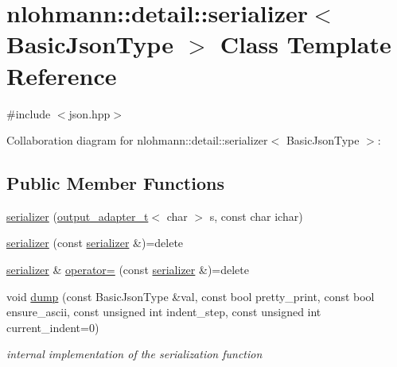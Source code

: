 \hypertarget{classnlohmann_1_1detail_1_1serializer}{}\section{nlohmann\+:\+:detail\+:\+:serializer$<$ Basic\+Json\+Type $>$ Class Template Reference}
\label{classnlohmann_1_1detail_1_1serializer}


{\ttfamily \#include $<$json.\+hpp$>$}



Collaboration diagram for nlohmann\+:\+:detail\+:\+:serializer$<$ Basic\+Json\+Type $>$\+:
\subsection*{Public Member Functions}
\begin{DoxyCompactItemize}
\item 
\hyperlink{classnlohmann_1_1detail_1_1serializer_a3076c4514179654cc81d17048439c24a}{serializer} (\hyperlink{namespacenlohmann_1_1detail_a9b680ddfb58f27eb53a67229447fc556}{output\+\_\+adapter\+\_\+t}$<$ char $>$ s, const char ichar)
\item 
\hyperlink{classnlohmann_1_1detail_1_1serializer_ae3771351ec4cb892bec707edeb56dc31}{serializer} (const \hyperlink{classnlohmann_1_1detail_1_1serializer}{serializer} \&)=delete
\item 
\hyperlink{classnlohmann_1_1detail_1_1serializer}{serializer} \& \hyperlink{classnlohmann_1_1detail_1_1serializer_a5f14c33012477b9f9876dc54d97009a0}{operator=} (const \hyperlink{classnlohmann_1_1detail_1_1serializer}{serializer} \&)=delete
\item 
void \hyperlink{classnlohmann_1_1detail_1_1serializer_a95460ebd1a535a543e5a0ec52e00f48b}{dump} (const Basic\+Json\+Type \&val, const bool pretty\+\_\+print, const bool ensure\+\_\+ascii, const unsigned int indent\+\_\+step, const unsigned int current\+\_\+indent=0)
\begin{DoxyCompactList}\small\item\em internal implementation of the serialization function \end{DoxyCompactList}\end{DoxyCompactItemize}
